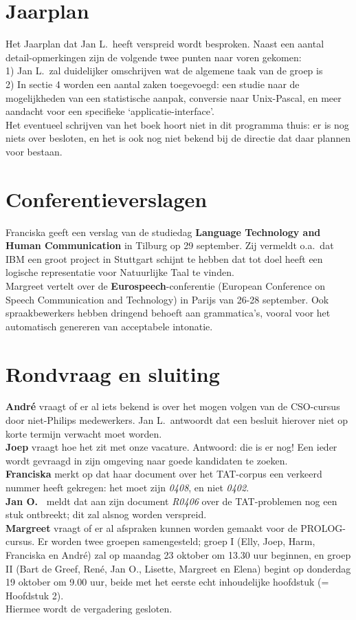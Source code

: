 \section{Jaarplan}
Het Jaarplan dat Jan L.\ heeft verspreid wordt besproken. Naast een aantal 
detail-opmerkingen zijn de volgende twee punten naar voren gekomen:\\
1) Jan L.\ zal duidelijker omschrijven wat de algemene taak van de groep is\\
2) In  sectie 4 worden een aantal zaken toegevoegd: een studie naar de 
mogelijkheden van een statistische aanpak, conversie naar Unix-Pascal, 
en meer aandacht voor een specifieke `applicatie-interface'.\\
Het eventueel schrijven van het boek hoort niet in dit programma thuis: er is 
nog niets over besloten, en het is ook nog niet bekend bij de directie dat daar 
plannen voor bestaan.

\section{Conferentieverslagen}
Franciska geeft een verslag van de studiedag {\bf Language Technology and Human 
Communication} in Tilburg op 29 september. Zij vermeldt o.a.\ dat IBM een groot 
project in Stuttgart schijnt te hebben dat tot doel heeft een logische 
representatie voor Natuurlijke Taal te vinden.\\
Margreet vertelt over de {\bf Eurospeech}-conferentie (European Conference on 
Speech Communication and Technology) in Parijs van 26-28 september. Ook 
spraakbewerkers hebben dringend behoeft aan grammatica's, vooral voor het 
automatisch genereren van acceptabele intonatie. 

\section{Rondvraag en sluiting}
{\bf  Andr\'{e} } vraagt of er al iets bekend is over het mogen volgen van de 
CSO-cursus door niet-Philips medewerkers.  Jan L.\ antwoordt dat een besluit 
hierover niet op korte termijn verwacht moet worden.\\
{\bf Joep} vraagt hoe het zit met onze vacature. Antwoord: die is er nog! Een 
ieder wordt gevraagd in zijn omgeving naar goede kandidaten te zoeken.\\
{\bf Franciska} merkt 
op dat haar document over het TAT-corpus een verkeerd nummer heeft gekregen: 
het moet zijn {\em 0408\/}, en niet {\em 0402\/}. \\
{\bf Jan O.\ } meldt dat aan zijn document {\em 
R0406\/} over de TAT-problemen nog een stuk ontbreekt; dit zal alsnog worden 
verspreid. \\
{\bf Margreet} vraagt of er al afspraken kunnen worden gemaakt voor de 
PROLOG-cursus. Er worden twee groepen samengesteld; groep I (Elly, Joep, Harm, 
Franciska en Andr\'{e}) zal op maandag 23 oktober om 13.30 uur beginnen, en 
groep II (Bart de Greef, Ren\'{e}, Jan O., Lisette, Margreet en Elena) begint op 
donderdag 19 oktober om 9.00 uur, beide met het eerste echt inhoudelijke 
hoofdstuk (= Hoofdstuk 2).
\\[3ex]
Hiermee wordt de vergadering gesloten.


